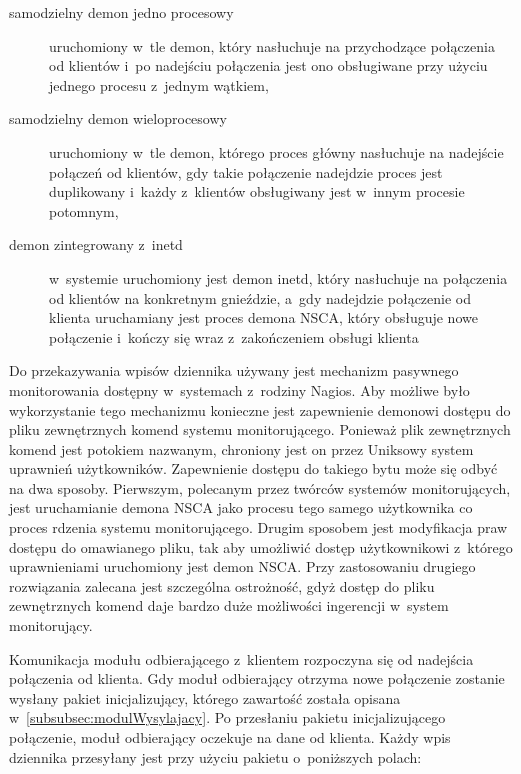 \begin{description}
\item[samodzielny demon jedno procesowy] uruchomiony w~tle demon, który
  nasłuchuje na przychodzące połączenia od klientów i~po nadejściu
  połączenia jest ono obsługiwane przy użyciu jednego procesu z~jednym
  wątkiem,
\item[samodzielny demon wieloprocesowy] uruchomiony w~tle demon,
  którego proces główny nasłuchuje na nadejście połączeń od klientów,
  gdy takie połączenie nadejdzie proces jest duplikowany i~każdy
  z~klientów obsługiwany jest w~innym procesie potomnym,
\item[demon zintegrowany z~inetd] w~systemie uruchomiony jest demon
  inetd, który nasłuchuje na połączenia od klientów na konkretnym
  gnieździe, a~gdy nadejdzie połączenie od klienta uruchamiany jest
  proces demona NSCA, który obsługuje nowe połączenie i~kończy się
  wraz z~zakończeniem obsługi klienta
\end{description}

Do przekazywania wpisów dziennika używany jest mechanizm pasywnego
monitorowania dostępny w~systemach z~rodziny Nagios. Aby możliwe było
wykorzystanie tego mechanizmu konieczne jest zapewnienie demonowi
dostępu do pliku zewnętrznych komend systemu monitorującego. Ponieważ
plik zewnętrznych komend jest potokiem nazwanym, chroniony jest on
przez Uniksowy system uprawnień użytkowników. Zapewnienie dostępu do
takiego bytu może się odbyć na dwa sposoby. Pierwszym, polecanym przez
twórców systemów monitorujących, jest uruchamianie demona NSCA jako
procesu tego samego użytkownika co proces rdzenia systemu
monitorującego. Drugim sposobem jest modyfikacja praw dostępu do
omawianego pliku, tak aby umożliwić dostęp użytkownikowi z~którego
uprawnieniami uruchomiony jest demon NSCA. Przy zastosowaniu drugiego
rozwiązania zalecana jest szczególna ostrożność, gdyż dostęp do pliku
zewnętrznych komend daje bardzo duże możliwości ingerencji w~system
monitorujący.

Komunikacja modułu odbierającego z~klientem rozpoczyna się od nadejścia
połączenia od klienta. Gdy moduł odbierający otrzyma nowe połączenie
zostanie wysłany pakiet inicjalizujący, którego zawartość została
opisana w~\ref{subsubsec:modulWysylajacy}. Po przesłaniu pakietu
inicjalizującego połączenie, moduł odbierający oczekuje na dane od
klienta. Każdy wpis dziennika przesyłany jest przy użyciu pakietu
o~poniższych polach:

